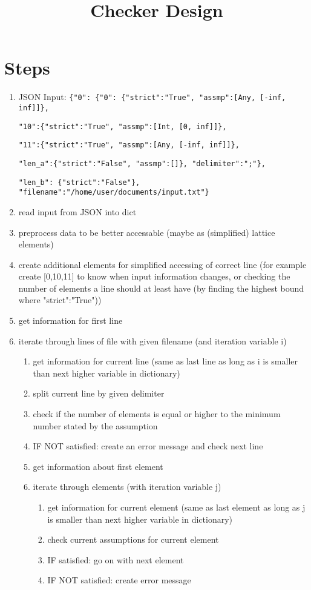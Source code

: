 \documentclass[11pt]{article}
\begin{document}
\title{Checker Design}
\maketitle


\section{Steps}

\begin{enumerate}
\item JSON Input: \verb|{"0": {"0": {"strict":"True", "assmp":[Any, [-inf, inf]]}, |

\verb|"10":{"strict":"True", "assmp":[Int, [0, inf]]}, |

\verb|"11":{"strict":"True", "assmp":[Any, [-inf, inf]]}, |

\verb|"len_a":{"strict":"False", "assmp":[]}, "delimiter":";"}, |

\verb|"len_b": {"strict":"False"}, "filename":"/home/user/documents/input.txt"}|
\item read input from JSON into dict
\item preprocess data to be better accessable (maybe as (simplified) lattice elements)
\item create additional elements for simplified accessing of correct line (for example create [0,10,11] to know when input information changes, or checking the number of elements a line should at least have (by finding the highest bound where "strict":"True"))
\item get information for first line
\item iterate through lines of file with given filename (and iteration variable i)
\begin{enumerate}
\item get information for current line (same as last line as long as i is smaller than next higher variable in dictionary)
\item split current line by given delimiter
\item check if the number of elements is equal or higher to the minimum number stated by the assumption
\item IF NOT satisfied: create an error message and check next line
\item get information about first element
\item iterate through elements (with iteration variable j)
\begin{enumerate}
\item get information for current element (same as last element as long as j is smaller than next higher variable in dictionary)
\item check current assumptions for current element
\item IF satisfied: go on with next element
\item IF NOT satisfied: create error message
\end{enumerate}
\end{enumerate}
\end{enumerate}
\end{document}
